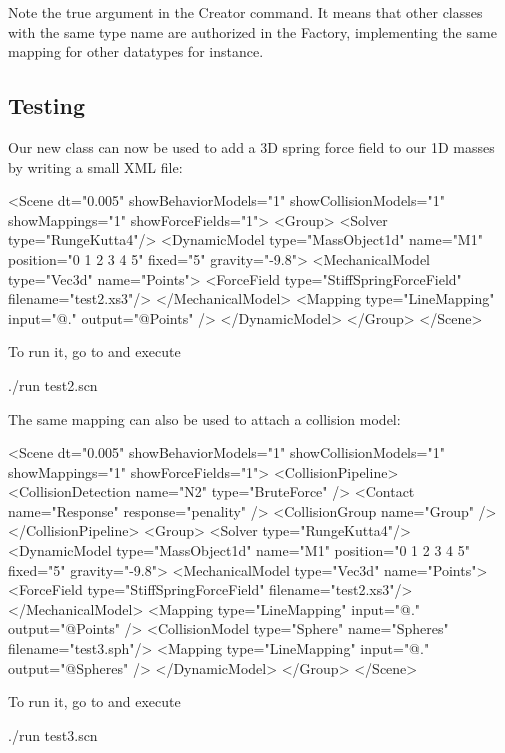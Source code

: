 Note the true argument in the Creator command. It means that other classes with the same type name are authorized in the Factory, implementing the same mapping for other datatypes for instance.

\subsection{Testing}

Our new class can now be used to add a 3D spring force field to our 1D masses by writing a small XML file:

\begin{code_xml}
<Scene dt="0.005" showBehaviorModels="1" showCollisionModels="1" showMappings="1" showForceFields="1">
	<Group>
		<Solver type="RungeKutta4"/>
		<DynamicModel type="MassObject1d" name="M1" position="0 1 2 3 4 5" fixed="5" gravity="-9.8">
		<MechanicalModel type="Vec3d" name="Points">
		<ForceField type="StiffSpringForceField" filename="test2.xs3"/>
		</MechanicalModel>
		<Mapping type="LineMapping" input="@." output="@Points" />
		</DynamicModel>
	</Group>
</Scene>
\end{code_xml}

To run it, go to  and execute
\begin{code_bash}
./run test2.scn
\end{code_bash}

The same mapping can also be used to attach a collision model:

\begin{code_xml}
<Scene dt="0.005" showBehaviorModels="1" showCollisionModels="1" showMappings="1" showForceFields="1">
	<CollisionPipeline>
		<CollisionDetection name="N2" type="BruteForce" />
		<Contact name="Response" response="penality" />
		<CollisionGroup name="Group" />
	</CollisionPipeline>
	<Group>
		<Solver type="RungeKutta4"/>
		<DynamicModel type="MassObject1d" name="M1" position="0 1 2 3 4 5" fixed="5" gravity="-9.8">
		<MechanicalModel type="Vec3d" name="Points">
		<ForceField type="StiffSpringForceField" filename="test2.xs3"/>
		</MechanicalModel>
		<Mapping type="LineMapping" input="@." output="@Points" />
		<CollisionModel type="Sphere" name="Spheres" filename="test3.sph"/>
		<Mapping type="LineMapping" input="@." output="@Spheres" />
		</DynamicModel>
	</Group>
</Scene>
\end{code_xml}

To run it, go to  and execute
\begin{code_bash}
./run test3.scn
\end{code_bash}

